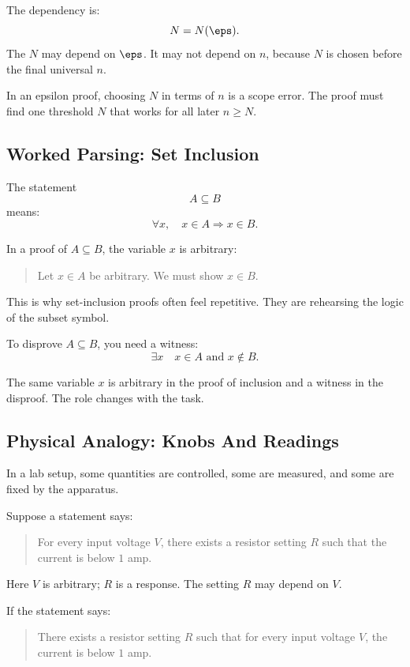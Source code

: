 The dependency is:
\[
N=N(\eps).
\]
The $N$ may depend on $\eps$. It may not depend on $n$, because $N$ is chosen before the final universal $n$.

\begin{trapbox}
In an epsilon proof, choosing $N$ in terms of $n$ is a scope error. The proof must find one threshold $N$ that works for all later $n\geq N$.
\end{trapbox}

\subsection{Worked Parsing: Set Inclusion}

The statement
\[
A\subseteq B
\]
means:
\[
\forall x,\quad x\in A\Rightarrow x\in B.
\]

In a proof of $A\subseteq B$, the variable $x$ is arbitrary:

\begin{quote}
Let $x\in A$ be arbitrary. We must show $x\in B$.
\end{quote}

This is why set-inclusion proofs often feel repetitive. They are rehearsing the logic of the subset symbol.

To disprove $A\subseteq B$, you need a witness:
\[
\exists x\quad x\in A\text{ and }x\notin B.
\]

The same variable $x$ is arbitrary in the proof of inclusion and a witness in the disproof. The role changes with the task.

\subsection{Physical Analogy: Knobs And Readings}

In a lab setup, some quantities are controlled, some are measured, and some are fixed by the apparatus.

Suppose a statement says:

\begin{quote}
For every input voltage $V$, there exists a resistor setting $R$ such that the current is below $1$ amp.
\end{quote}

Here $V$ is arbitrary; $R$ is a response. The setting $R$ may depend on $V$.

If the statement says:

\begin{quote}
There exists a resistor setting $R$ such that for every input voltage $V$, the current is below $1$ amp.
\end{quote}

